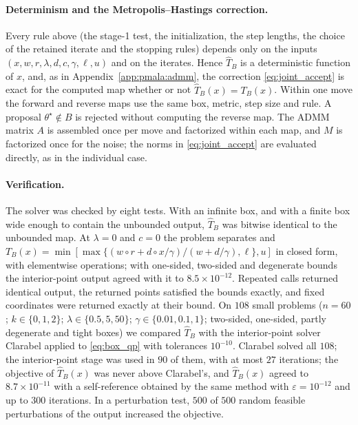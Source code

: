 \paragraph{Determinism and the Metropolis--Hastings correction.} Every rule above (the stage-1 test, the initialization, the step lengths, the choice of the retained iterate and the stopping rules) depends only on the inputs $(x, w, r, \lambda, d, c, \gamma, \ell, u)$ and on the iterates. Hence $\widehat T_B$ is a deterministic function of $x$, and, as in Appendix~\ref{app:pmala:admm}, the correction \eqref{eq:joint_accept} is exact for the computed map whether or not $\widehat T_B(x) = T_B(x)$. Within one move the forward and reverse maps use the same box, metric, step size and rule. A proposal $\theta^\star \notin B$ is rejected without computing the reverse map. The ADMM matrix $A$ is assembled once per move and factorized within each map, and $M$ is factorized once for the noise; the norms in \eqref{eq:joint_accept} are evaluated directly, as in the individual case.

\paragraph{Verification.} The solver was checked by eight tests. With an infinite box, and with a finite box wide enough to contain the unbounded output, $\widehat T_B$ was bitwise identical to the unbounded map. At $\lambda = 0$ and $c = 0$ the problem separates and $T_B(x) = \min[\max\{(w\circ r + d\circ x/\gamma)/(w + d/\gamma), \ell\}, u]$ in closed form, with elementwise operations; with one-sided, two-sided and degenerate bounds the interior-point output agreed with it to $8.5\times10^{-12}$. Repeated calls returned identical output, the returned points satisfied the bounds exactly, and fixed coordinates were returned exactly at their bound. On $108$ small problems ($n = 60$; $k \in \{0, 1, 2\}$; $\lambda \in \{0.5, 5, 50\}$; $\gamma \in \{0.01, 0.1, 1\}$; two-sided, one-sided, partly degenerate and tight boxes) we compared $\widehat T_B$ with the interior-point solver Clarabel \citep{goulart2024clarabel} applied to \eqref{eq:box_qp} with tolerances $10^{-10}$. Clarabel solved all $108$; the interior-point stage was used in $90$ of them, with at most $27$ iterations; the objective of $\widehat T_B(x)$ was never above Clarabel's, and $\widehat T_B(x)$ agreed to $8.7\times10^{-11}$ with a self-reference obtained by the same method with $\varepsilon = 10^{-12}$ and up to $300$ iterations. In a perturbation test, $500$ of $500$ random feasible perturbations of the output increased the objective.

